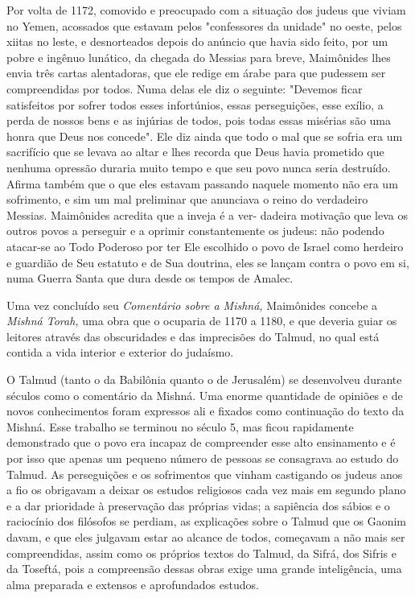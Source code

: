 \begin{itemize}
\begin{enumrate}
Por volta de 1172, comovido e preocupado com a situação dos ju­deus que
viviam no Yemen, acossados que estavam pelos "confessores da uni­dade"
no oeste, pelos xiitas no leste, e desnorteados depois do anúncio que
havia sido feito, por um pobre e ingênuo lunático, da chegada do Messias
para breve, Maimônides lhes envia três cartas alentadoras, que ele
redige em árabe para que pudessem ser compreendidas por todos. Numa
delas ele diz o seguin­te: "Devemos ficar satisfeitos por sofrer todos
esses infortúnios, essas perse­guições, esse exílio, a perda de nossos
bens e as injúrias de todos, pois todas essas misérias são uma honra que
Deus nos concede". Ele diz ainda que todo o mal que se sofria era um
sacrifício que se levava ao altar e lhes recorda que Deus havia
prometido que nenhuma opressão duraria muito tempo e que seu povo nunca
seria destruído. Afirma também que o que eles estavam passando naquele
momento não era um sofrimento, e sim um mal preliminar que anun­ciava o
reino do verdadeiro Messias. Maimônides acredita que a inveja é a ver-
dadeira motivação que leva os outros povos a perseguir e a oprimir
constante­mente os judeus: não podendo atacar-se ao Todo Poderoso por
ter Ele escolhi­do o povo de Israel como herdeiro e guardião de Seu
estatuto e de Sua doutri­na, eles se lançam contra o povo em si, numa
Guerra Santa que dura desde os tempos de Amalec.

Uma vez concluído seu \emph{Comentário sobre a Mishná,} Maimônides
concebe a \emph{Mishná Torah,} uma obra que o ocuparia de 1170 a 1180, e
que de­veria guiar os leitores através das obscuridades e das
imprecisões do Talmud, no qual está contida a vida interior e exterior
do judaísmo.

O Talmud (tanto o da Babilônia quanto o de Jerusalém) se desenvol­veu
durante séculos como o comentário da Mishná. Uma enorme quantidade de
opiniões e de novos conhecimentos foram expressos ali e fixados como
con­tinuação do texto da Mishná. Esse trabalho se terminou no século 5,
mas ficou rapidamente demonstrado que o povo era incapaz de compreender
esse alto ensinamento e é por isso que apenas um pequeno número de
pessoas se consa­grava ao estudo do Talmud. As perseguições e os
sofrimentos que vinham cas­tigando os judeus anos a fio os obrigavam a
deixar os estudos religiosos cada vez mais em segundo plano e a dar
prioridade à preservação das próprias vidas; a sapiência dos sábios e o
raciocínio dos filósofos se perdiam, as explicações sobre o Talmud que
os Gaonim davam, e que eles julgavam estar ao alcance de todos,
começavam a não mais ser compreendidas, assim como os próprios textos do
Talmud, da Sifrá, dos Sifris e da Toseftá, pois a compreensão dessas
obras exige uma grande inteligência, uma alma preparada e extensos e
aprofun­dados estudos.


\end{enumrate}
\end{itemize}
